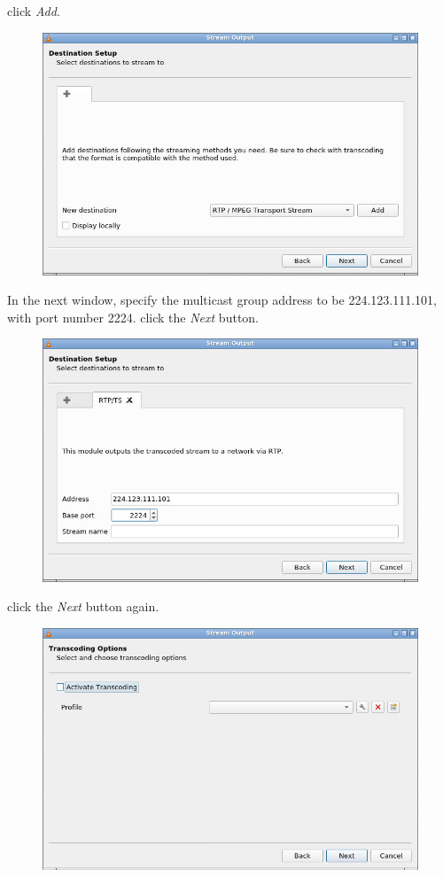 \documentclass{../UTNetLab}
\begin{document}
    click \textit{Add}.
    \begin{figure}[H]
        \centering
        \includegraphics[scale=1.8]{img/stream2}
    \end{figure}
    In the next window, specify the multicast group address to be {224.123.111.101}, with port number {2224}.
    click the \textit{Next} button.
    \begin{figure}[H]
        \centering
        \includegraphics[scale=1.8]{img/stream3}
    \end{figure}
    click the \textit{Next} button again.
    \begin{figure}[H]
        \centering
        \includegraphics[scale=1.8]{img/stream4}
    \end{figure}
\end{document}
